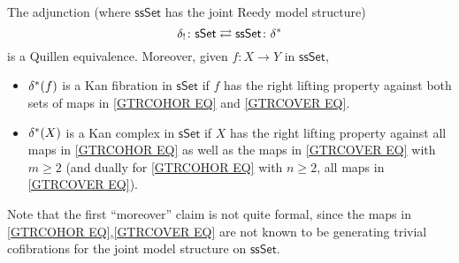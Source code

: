 \documentclass[a4paper,10pt
 ,draft
]{article}%
\begin{document}
\begin{corollary}\label{SSETSSETADJ COR}
	The adjunction (where $\mathsf{ssSet}$ has the joint Reedy model structure)
\[
	\delta_{!}\colon \mathsf{sSet} 
		\rightleftarrows 
	\mathsf{ssSet} \colon \delta^{\**}
\]
is a Quillen equivalence.
Moreover, given $f\colon X \to Y$ in $\mathsf{ssSet}$, 
\begin{itemize}
\item $\delta^{\**} (f)$ is a Kan fibration in $\mathsf{sSet}$ if 
 $f$ has the right lifting property
against both sets of maps in
\eqref{GTRCOHOR EQ} and \eqref{GTRCOVER EQ}.
\item $\delta^{\**}(X)$ is a Kan complex in $\mathsf{sSet}$ if $X$ has the right lifting property against all maps in \eqref{GTRCOHOR EQ} 
as well as the maps in \eqref{GTRCOVER EQ}
with $m \geq 2$ (and dually for \eqref{GTRCOHOR EQ} with $n \geq 2$, all maps in \eqref{GTRCOVER EQ}).
\end{itemize}
\end{corollary}



Note that the first ``moreover'' claim 
is not quite formal, since the maps in \eqref{GTRCOHOR EQ},\eqref{GTRCOVER EQ} are not known to be generating trivial cofibrations for the joint model structure on $\mathsf{ssSet}$.
\end{document}
